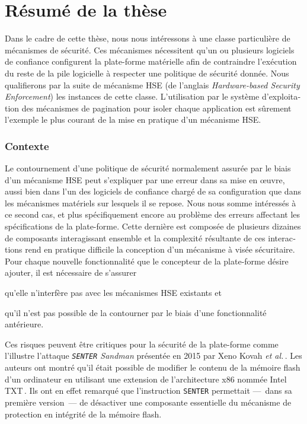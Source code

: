 \chapter{Résumé de la thèse}

\begin{otherlanguage}{french}
  Dans le cadre de cette thèse, nous nous intéressons à une classe particulière
  de mécanismes de sécurité. Ces mécanismes nécessitent qu'un ou plusieurs logiciels de confiance configurent la plate-forme matérielle afin de contraindre l’exécution du reste de la pile logicielle à
  respecter une politique de sécurité donnée.
  Nous qualifierons par la suite de mécanisme HSE (de l’anglais
  \emph{Hardware-based Security Enforcement}) les instances de cette
  classe.
  L’utilisation par le système d’exploitation des mécanismes de pagination pour
  isoler chaque application est sûrement l’exemple le plus courant de la mise en
  pratique d’un mécanisme HSE.

  \subsection*{Contexte}

  Le contournement d’une politique de sécurité normalement assurée par le biais
  d’un mécanisme HSE peut s’expliquer par une erreur dans sa mise en œuvre,
  aussi bien dans l’un des logiciels de confiance chargé de sa configuration que
  dans les mécanismes matériels sur lesquels il se repose.
  Nous nous somme intéressés à ce second cas, et plus spécifiquement encore au
  problème des erreurs affectant les spécifications de la plate-forme.
  Cette dernière est composée de plusieurs dizaines de composants interagissant
  ensemble et la complexité résultante de ces interactions rend en pratique
  difficile la conception d’un mécanisme à visée sécuritaire.
  Pour chaque nouvelle fonctionnalité que le concepteur de la plate-forme désire
  ajouter, il est nécessaire de s’assurer
  \begin{inparaenum}[(1)]
  \item qu’elle n’interfère pas avec les mécanismes HSE existants et
  \item qu'il n'est pas possible de la contourner par le biais d’une
    fonctionnalité antérieure.
  \end{inparaenum}
  Ces risques peuvent être critiques pour la sécurité de la plate-forme comme
  l'illustre l’attaque \emph{\texttt{SENTER} Sandman} présentée en 2015 par Xeno
  Kovah \emph{et al.}\,\cite{kovah2015senter}.
  Les auteurs ont montré qu’il était possible de modifier le contenu de la
  mémoire flash d’un ordinateur en utilisant une extension de l’architecture x86
  nommée Intel TXT\,\cite{intel2015txt}.
  Ils ont en effet remarqué que l’instruction \texttt{SENTER} permettait
  ---~dans sa première version~--- de désactiver une composante essentielle du
  mécanisme de protection en intégrité de la mémoire flash.


\end{otherlanguage}
